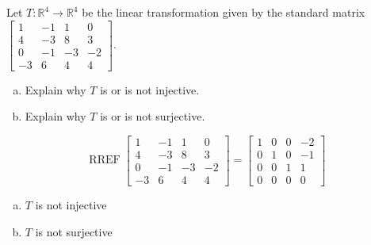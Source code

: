 
\begin{exerciseStatement}
 Let \(T:\mathbb{R}^ 4  \to \mathbb{R}^ 4 \) be the linear transformation given by the standard matrix \( \left[\begin{array}{cccc}
1 & -1 & 1 & 0 \\
4 & -3 & 8 & 3 \\
0 & -1 & -3 & -2 \\
-3 & 6 & 4 & 4
\end{array}\right] .\)
\begin{enumerate}[(a)]
\item Explain why \(T\) is or is not injective.
\item Explain why \(T\) is or is not surjective.
\end{enumerate}
    
\end{exerciseStatement}
    
\begin{exerciseAnswer} 


\[\operatorname{RREF} \left[\begin{array}{cccc}
1 & -1 & 1 & 0 \\
4 & -3 & 8 & 3 \\
0 & -1 & -3 & -2 \\
-3 & 6 & 4 & 4
\end{array}\right] = \left[\begin{array}{cccc}
1 & 0 & 0 & -2 \\
0 & 1 & 0 & -1 \\
0 & 0 & 1 & 1 \\
0 & 0 & 0 & 0
\end{array}\right] \]


\begin{enumerate}[(a)]
\item \(T\) is not injective
\item \(T\) is not surjective
\end{enumerate}
    
\end{exerciseAnswer}
    
